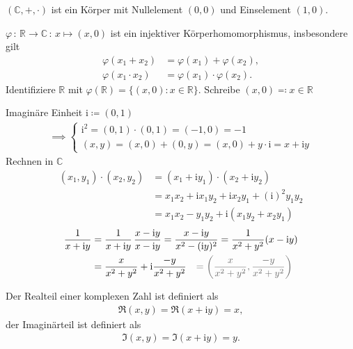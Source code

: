 \documentclass[a4paper,10pt]{scrbook}
\begin{document}
\begin{notice}
  \begin{enum-arab}
    \item $(\mathbb{C},+,\cdot)$ ist ein Körper mit Nullelement $(0,0)$ und Einselement $(1,0)$.

    \item $\varphi \, : \, \mathbb{R} \to \mathbb{C} \, : \, x \mapsto (x,0)$ ist ein injektiver Körperhomomorphismus, insbesondere gilt
    \begin{align*}
      \varphi(x_1 + x_2) &= \varphi(x_1) + \varphi(x_2), \\
      \varphi(x_1 \cdot x_2) &= \varphi(x_1) \cdot \varphi(x_2).
    \end{align*}
    Identifiziere $\mathbb{R}$ mit $\varphi(\mathbb{R})=\{ (x,0) : x \in \mathbb{R} \}$. Schreibe $(x,0) \eqcolon x \in \mathbb{R}$

    \item Imaginäre Einheit $\mathrm{i} \coloneq (0,1)$
    \begin{align*}
      \implies
      \begin{cases}
        \mathrm{i}^2 = (0,1) \cdot (0,1) = (-1,0) = -1 \\
        (x,y) = (x,0) + (0,y) = (x,0) + y \cdot \mathrm{i} = x + \mathrm{i} y
      \end{cases}
    \end{align*}
    Rechnen in $\mathbb{C}$
    \begin{align*}
      (x_1,y_1) \cdot (x_2,y_2) &= (x_1 + \mathrm{i} y_1) \cdot (x_2 + \mathrm{i} y_2) \\
      &= x_1 x_2 + \mathrm{i} x_1 y_2 + \mathrm{i} x_2 y_1 + (\mathrm{i})^2 y_1 y_2 \\
      &= x_1 x_2 - y_1 y_2 + \mathrm{i} (x_1 y_2 + x_2 y_1)
    \end{align*}
    \begin{align*}
      \frac{1}{x + \mathrm{i} y} &= \frac{1}{x + \mathrm{i} y} \, \frac{x - \mathrm{i} y}{x - \mathrm{i} y} = \frac{x - \mathrm{i} y}{x^2 - (\mathrm{i} y)^2} = \frac{1}{x^2 + y^2} (x - \mathrm{i} y) \\
      &= \frac{x}{x^2 + y^2} + \mathrm{i} \frac{-y}{x^2 + y^2} \quad {\color{DimGray} = \left( \frac{x}{x^2 + y^2}, \frac{-y}{x^2 + y^2} \right)}
    \end{align*}
  \end{enum-arab}

  Der Realteil einer komplexen Zahl ist definiert als
  \begin{align*}
    \Re(x,y) = \Re(x + \mathrm{i} y) = x,
  \end{align*}
  der Imaginärteil ist definiert als
  \begin{align*}
    \Im(x,y) = \Im(x + \mathrm{i} y) = y.
  \end{align*}


\end{notice}
\end{document}

